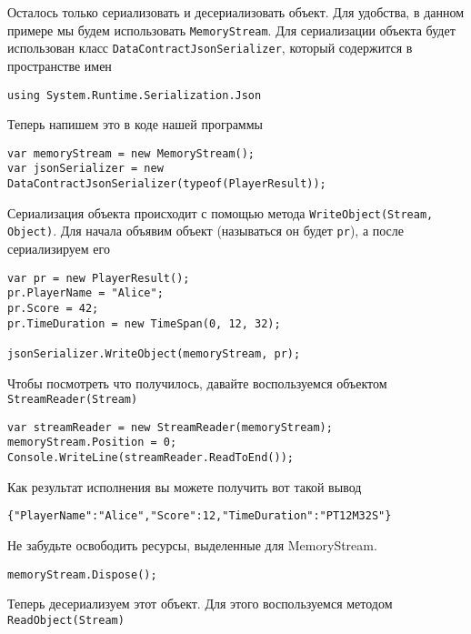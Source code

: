 Осталось только сериализовать и десериализовать объект. Для удобства, в данном примере мы будем использовать \texttt{MemoryStream}. Для сериализации объекта будет использован класс \texttt{DataContractJsonSerializer}, который содержится в пространстве имен

\begin{verbatim}
using System.Runtime.Serialization.Json
\end{verbatim}

Теперь напишем это в коде нашей программы

\begin{verbatim}
var memoryStream = new MemoryStream();
var jsonSerializer = new DataContractJsonSerializer(typeof(PlayerResult));
\end{verbatim}

Сериализация объекта происходит с помощью метода \texttt{WriteObject(Stream, Object)}. Для начала объявим объект (называться он будет \texttt{pr}), а после сериализируем его

\begin{verbatim}
var pr = new PlayerResult();
pr.PlayerName = "Alice";
pr.Score = 42;
pr.TimeDuration = new TimeSpan(0, 12, 32);

jsonSerializer.WriteObject(memoryStream, pr);
\end{verbatim}

Чтобы посмотреть что получилось, давайте воспользуемся объектом \texttt{StreamReader(Stream)}

\begin{verbatim}
var streamReader = new StreamReader(memoryStream);
memoryStream.Position = 0;
Console.WriteLine(streamReader.ReadToEnd());
\end{verbatim}

Как результат исполнения вы можете получить вот такой вывод

\begin{verbatim}
{"PlayerName":"Alice","Score":12,"TimeDuration":"PT12M32S"}
\end{verbatim}


Не забудьте освободить ресурсы, выделенные для MemoryStream.
\begin{verbatim}
memoryStream.Dispose();
\end{verbatim}

Теперь десериализуем этот объект. Для этого воспользуемся методом \texttt{ReadObject(Stream)}

